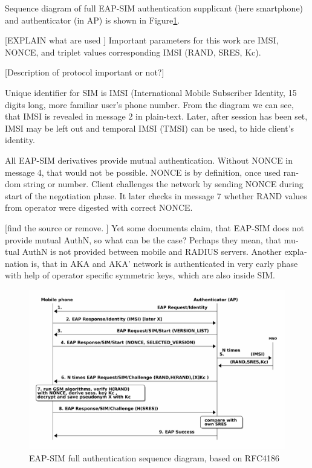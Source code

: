 \documentclass[12pt,a4paper,english]{tutthesis}
\begin{document}
\begin{otherlanguage}{english}
Sequence diagram of full EAP-SIM authentication supplicant (here
smartphone) and authenticator (in AP) is shown in
Figure\ref{fig:eap-sim-full}. 

[EXPLAIN what are used ]
Important parameters for this work are IMSI, NONCE, and triplet values
corresponding IMSI (RAND, SRES, Kc).

[Description of protocol important or not?]

Unique identifier for SIM is IMSI (International Mobile Subscriber
Identity, 15 digits long, more familiar user's phone number.
From the diagram we can see, that IMSI is
revealed in message 2 in plain-text. Later, after session has been
set, IMSI may be left out and temporal IMSI (TMSI) can be used,
to hide client's identity.

All EAP-SIM derivatives provide mutual authentication. Without NONCE
in message 4, that would not be possible. NONCE is by definition, once
used random string or number.
 Client challenges the network by
sending NONCE during start of the negotiation phase. It later checks in
message 7 whether RAND values from operator were digested with correct NONCE.

[find the source or remove. ] 
Yet some documents claim, that EAP-SIM does not provide mutual AuthN, so what
can be the case? Perhaps they mean, that mutual AuthN is not provided between
mobile and RADIUS servers. Another explanation is, that in AKA
and AKA' network is authenticated in very early phase with help of operator specific
symmetric keys, which are also inside SIM.





\begin{figure}[htb]
\centering
\includegraphics[width=.9\linewidth]{eap-sim-full.png}
\caption{\label{fig:eap-sim-full}EAP-SIM full authentication sequence diagram, based on RFC4186}
\end{figure}

\end{otherlanguage}
\end{document}
